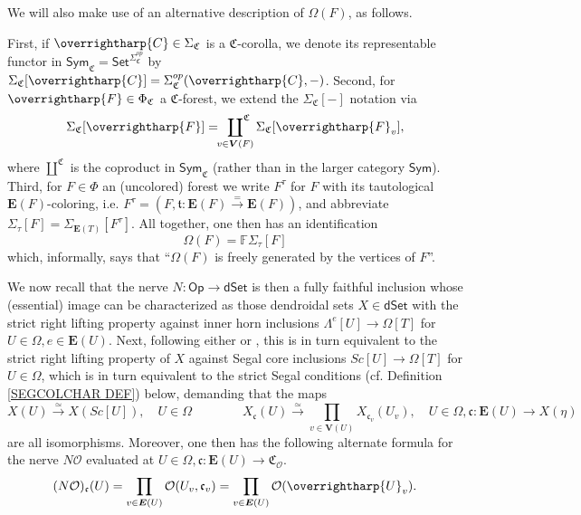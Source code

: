 \documentclass[a4paper,10pt
,draft
]{article}%
\numberwithin{equation}{section}
\numberwithin{figure}{section}
\theoremstyle{definition} %
\newcommand{\vect}[1]{\text{\overrightharp{\ensuremath{#1}}}}
\newcommand{\Sym}{\ensuremath{\mathsf{Sym}}}%
\renewcommand{\O}{\ensuremath{\mathcal O}}
\newcommand{\1}{\ensuremath{\mathbbm 1}}%
\begin{document}
We will also make use of an alternative description of $\Omega(F)$, as follows.

First, if $\vect{C}\in \Sigma_{\mathfrak{C}}$ is a
$\mathfrak{C}$-corolla,
we denote its representable functor
in 
$\Sym_{\mathfrak C} = \mathsf{Set}^{\Sigma^{op}_{\mathfrak{C}}}$
by 
$\Sigma_{\mathfrak C}[\vect C] =
\Sigma_{\mathfrak C}^{op}(\vect C, -)$.
Second, for
$\vect{F}\in \Phi_{\mathfrak{C}}$ a
$\mathfrak{C}$-forest, 
we extend the 
$\Sigma_{\mathfrak C}[-]$ notation via
\[
	\Sigma_{\mathfrak C}[\vect F] = \sideset{}{^{\mathfrak C}}\coprod_{v \in \boldsymbol{V}(F)} \Sigma_{\mathfrak C}[\vect F_v],
\]
where $\amalg^{\mathfrak C}$ is the coproduct
in $\Sym_{\mathfrak C}$ (rather than in the larger category $\Sym$).
Third, for 
$F \in \Phi$
an (uncolored) forest we write
$F^{\tau}$ for $F$ with its tautological 
$\boldsymbol{E}(F)$-coloring, i.e.
$F^{\tau} = 
(F,\mathfrak{t}\colon \boldsymbol{E}(F) \xrightarrow{=} \boldsymbol{E}(F))$,
and abbreviate
$\Sigma_{\tau}[F] = \Sigma_{\boldsymbol{E}(T)}[F^{\tau}]$.
All together, one then has an identification
\begin{equation}\label{OMFFREE EQ}
	\Omega(F) = \mathbb{F} \Sigma_{\tau}[F]
\end{equation}
which, informally, says that 
``$\Omega(F)$ is freely generated by the vertices of $F$''.




We now recall \cite[Prop. 5.3 and Thm. 6.1]{MW09}
that the nerve
$N \colon \mathsf{Op} \to \mathsf{dSet}$
is then a fully faithful inclusion
whose (essential) image can be characterized
as those
dendroidal sets $X \in \mathsf{dSet}$
with the strict right lifting property against inner horn inclusions
$\Lambda^e[U] \to \Omega[T]$ for $U\in\Omega,e\in \boldsymbol{E}(U)$.
Next,
following either \cite[Prop. 2.5 and Cor. 2.6]{CM13a}
or \cite[Props. 3.22 and 3.31]{BP_edss},
this is in turn equivalent to the strict right lifting property of $X$
against Segal core inclusions
$Sc[U] \to \Omega[T]$ for $U \in \Omega$,
which is in turn equivalent to the strict Segal conditions
(cf. Definition \ref{SEGCOLCHAR DEF}) below,
demanding that the maps
\begin{equation}\label{STRSEGCON EQ}
	X(U)
	\xrightarrow{\simeq}
	X(Sc[U]),
	\quad
	U \in \Omega
\qquad \qquad
	X_{\mathfrak{c}}(U) 
	\xrightarrow{\simeq}
	\prod_{v \in \boldsymbol{V}(U)}
	X_{\mathfrak{c}_v}(U_v),
	\quad
	U \in \Omega,
	\mathfrak{c} \colon 
	\boldsymbol{E}(U) \to X(\eta)
\end{equation}
are all isomorphisms.
Moreover, one then has the following alternate formula for the nerve
$N \O$ evaluated at
$U\in \Omega,
\mathfrak{c} \colon \boldsymbol{E}(U) \to \mathfrak{C}_{\O}$.
\begin{equation}\label{ALTNER EQ}
	(N \O)_{\mathfrak{c}} (U) 
	= 
	\prod_{v \in \boldsymbol{E}(U)}
	\O(U_v,\mathfrak{c}_v)
	=
	\prod_{v \in \boldsymbol{E}(U)}
	\O(\vect{U}_v).
\end{equation}
\end{document}
